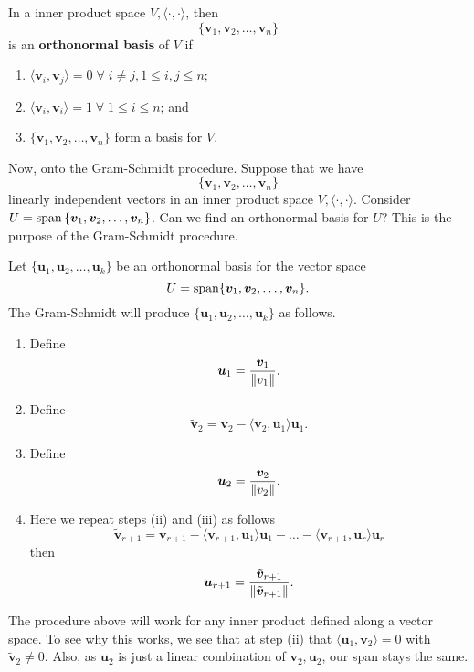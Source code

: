 \begin{definition}
    In a inner product space $V, \langle \cdot, \cdot \rangle$, then \[ \{ \bm v_1, \bm v_2, \ldots, \bm v_n \} \] is an \textbf{orthonormal basis} of $V$ if
    \begin{enumerate}
        \item $\langle \bm v_i, \bm v_j \rangle = 0 \; \forall \; i \neq j, 1 \leq i, j \leq n$;
        \item $\langle \bm v_i, \bm v_i \rangle = 1 \; \forall \; 1 \leq i \leq n$; and
        \item $\{ \bm v_1, \bm v_2, \ldots, \bm v_n \}$ form a basis for $V$.
    \end{enumerate}
\end{definition}

Now, onto the Gram-Schmidt procedure. Suppose that we have \[ \{ \bm v_1, \bm v_2, \ldots, \bm v_n \} \] linearly independent vectors in an inner product space $V, \langle \cdot, \cdot \rangle$. Consider $U = \operatorname{span}{\{ \bm v_1, \bm v_2, \ldots, \bm v_n \}}$. Can we find an orthonormal basis for $U$? This is the purpose of the Gram-Schmidt procedure.

\begin{definition}
    Let $\{ \bm u_1, \bm u_2, \ldots, \bm u_k \}$ be an orthonormal basis for the vector space \[ U = \operatorname{span} \{ \bm v_1, \bm v_2, \ldots, \bm v_n \}. \] The Gram-Schmidt will produce $\{ \bm u_1, \bm u_2, \ldots, \bm u_k \}$ as follows.
    \begin{enumerate}
        \item Define \[ \bm u_1 = \frac{\bm v_1}{\lVert v_1\rVert}. \]
        \item Define \[ \tilde{\bm v}_2 = \bm v_2 - \langle \bm v_2, \bm u_1 \rangle \bm u_1. \]
        \item Define \[ \bm u_2 = \frac{\bm v_2}{\lVert v_2\rVert}. \]
        \item Here we repeat steps (ii) and (iii) as follows \[ \tilde{\bm v}_{r + 1} = \bm v_{r + 1} - \langle \bm v_{r + 1}, \bm u_1 \rangle \bm u_1 - \ldots - \langle \bm v_{r + 1}, \bm u_r \rangle \bm u_r \] then \[ \bm u_{r + 1} = \frac{\tilde{\bm v}_{r + 1}}{\lVert\tilde{\bm v}_{r + 1}\rVert}. \]
    \end{enumerate}
\end{definition}

The procedure above will work for any inner product defined along a vector space. To see why this works, we see that at step (ii) that $\langle \bm u_1, \tilde{\bm v}_2 \rangle = 0$ with $\tilde{\bm v}_2 \neq 0$. Also, as $\bm u_2$ is just a linear combination of $\bm v_2, \bm u_2$, our span stays the same.

